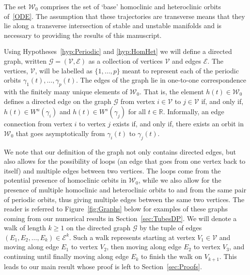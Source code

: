 \documentclass[11pt]{article}
\newcommand{\W}{\mathcal{W}}
\numberwithin{equation}{section}
\theoremstyle{plain}
\begin{document}
The set $\W_0$ comprises the set of `base' homoclinic and heteroclinic orbits of~\eqref{ODE}. The assumption that these trajectories are transverse means that they lie along a transverse intersection of stable and unstable manifolds and is necessary to providing the results of this manuscript.

Using Hypotheses~\ref{hyp:Periodic} and \ref{hyp:HomHet} we will define a directed graph, written $\mathcal{G} = (\mathcal{V},\mathcal{E})$ as a collection of vertices $\mathcal{V}$ and edges $\mathcal{E}$. The vertices, $\mathcal{V}$, will be labelled as $\{1,\dots,p\}$ meant to represent each of the periodic orbits $\gamma_1(t),\dots,\gamma_p(t)$. The edges of the graph lie in one-to-one correspondence with the finitely many unique elements of $\W_0$. That is, the element $h(t) \in \W_0$ defines a directed edge on the graph $\mathcal{G}$ from vertex $i \in\mathcal{V}$ to $j\in\mathcal{V}$ if, and only if, $h(t) \in W^u(\gamma_i)$ and $h(t) \in W^s(\gamma_j)$ for all $t \in \mathbb{R}$. Informally, an edge connection from vertex $i$ to vertex $j$ exists if, and only if, there exists an orbit in $\W_0$ that goes asymptotically from $\gamma_i(t)$ to $\gamma_j(t)$. 

We note that our definition of the graph not only contains directed edges, but also allows for the possibility of loops (an edge that goes from one vertex back to itself) and multiple edges between two vertices. The loops come from the potential presence of homoclinic orbits in $\W_0$, while we also allow for the presence of multiple homoclinic and heteroclinic orbits to and from the same pair of periodic orbits, thus giving multiple edges between the same two vertices. The reader is referred to Figure~\ref{fig:Graphs} below for examples of these graphs coming from our numerical results in Section~\ref{sec:TubesDP}. We will denote a walk of length $k \geq 1$ on the directed graph $\mathcal{G}$ by the tuple of edges $(E_1,E_2,\dots,E_k) \in \mathcal{E}^k$. Such a walk represents starting at vertex $V_1 \in \mathcal{V}$ and moving along edge $E_1$ to vertex $V_2$, then moving along edge $E_2$ to vertex $V_3$, and continuing until finally moving along edge $E_k$ to finish the walk on $V_{k+1}$. This leads to our main result whose proof is left to Section~\ref{sec:Proofs}.
\end{document}
